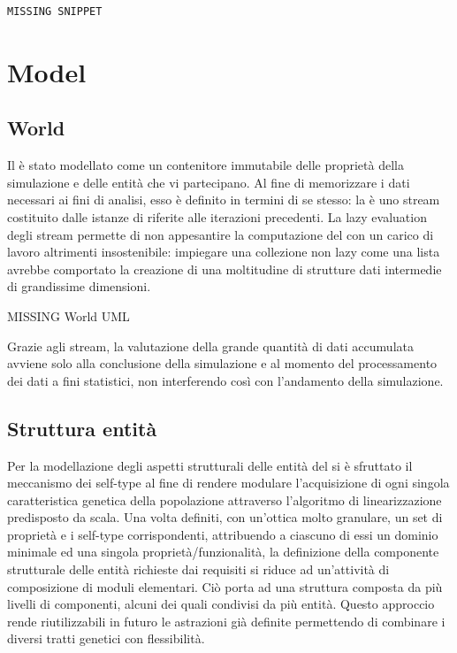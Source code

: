\begin{verbatim}
MISSING SNIPPET
\end{verbatim}

\section{Model}
\subsection{World}
Il  è stato modellato come un contenitore immutabile delle proprietà della simulazione e delle entità che vi partecipano. Al fine di memorizzare i dati necessari ai fini di analisi, esso è definito in termini di se stesso: la  è uno stream costituito dalle istanze di  riferite alle iterazioni precedenti. La lazy evaluation degli stream permette di non appesantire la computazione del  con un carico di lavoro altrimenti insostenibile: impiegare una collezione non lazy come una lista avrebbe comportato la creazione di una moltitudine di strutture dati intermedie di grandissime dimensioni. 

MISSING World UML

Grazie agli stream, la valutazione della grande quantità di dati accumulata avviene solo alla conclusione della simulazione e al momento del processamento dei dati a fini statistici, non interferendo così con l’andamento della simulazione.

\subsection{Struttura entità}
Per la modellazione degli aspetti strutturali delle entità del  si è sfruttato il meccanismo dei self-type al fine di rendere modulare l’acquisizione di ogni singola caratteristica genetica della popolazione attraverso l’algoritmo di linearizzazione predisposto da scala. Una volta definiti, con un’ottica molto granulare, un set di proprietà e i self-type corrispondenti, attribuendo a ciascuno di essi un dominio minimale ed una singola proprietà/funzionalità, la definizione della componente strutturale delle entità richieste dai requisiti si riduce ad un’attività di composizione di moduli elementari. Ciò porta ad una struttura composta da più livelli di componenti, alcuni dei quali condivisi da più entità. Questo approccio rende riutilizzabili in futuro le astrazioni già definite permettendo di combinare i diversi tratti genetici con flessibilità.

